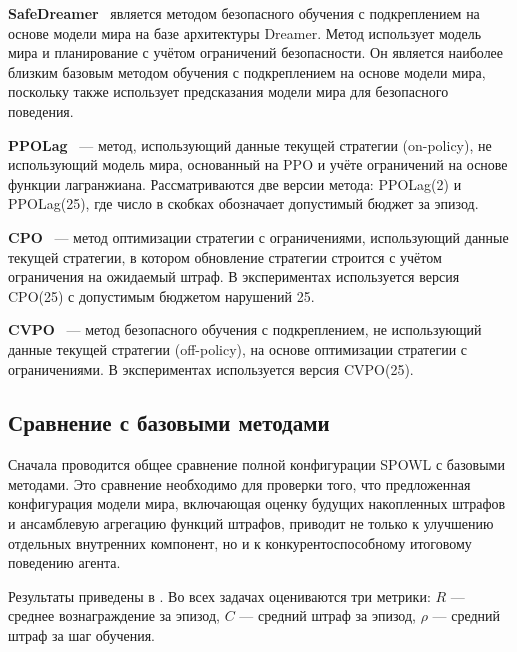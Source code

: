 \textbf{SafeDreamer}~\cite{safedreamer} является методом безопасного обучения с подкреплением на основе модели мира на базе архитектуры Dreamer. Метод использует модель мира и планирование с учётом ограничений безопасности. Он является наиболее близким базовым методом обучения с подкреплением на основе модели мира, поскольку также использует предсказания модели мира для безопасного поведения.

\textbf{PPOLag}~\cite{stooke2020pidlag} --- метод, использующий данные текущей стратегии (on-policy), не использующий модель мира, основанный на PPO и учёте ограничений на основе функции лагранжиана. Рассматриваются две версии метода: PPOLag(2) и PPOLag(25), где число в скобках обозначает допустимый бюджет за эпизод.

\textbf{CPO}~\cite{achiam2017cpo} --- метод оптимизации стратегии с ограничениями, использующий данные текущей стратегии, в котором обновление стратегии строится с учётом ограничения на ожидаемый штраф. В экспериментах используется версия CPO(25) с допустимым бюджетом нарушений 25.

\textbf{CVPO}~\cite{liu2022cvpo} --- метод безопасного обучения с подкреплением, не использующий данные текущей стратегии (off-policy), на основе оптимизации стратегии с ограничениями. В экспериментах используется версия CVPO(25).

\subsection{Сравнение с базовыми методами}
\label{subsec:spowl_baseline_comparison}

Сначала проводится общее сравнение полной конфигурации SPOWL с базовыми методами. Это сравнение необходимо для проверки того, что предложенная конфигурация модели мира, включающая оценку будущих накопленных штрафов и ансамблевую агрегацию функций штрафов, приводит не только к улучшению отдельных внутренних компонент, но и к конкурентоспособному итоговому поведению агента.

Результаты приведены в . Во всех задачах оцениваются три метрики: $R$ --- среднее вознаграждение за эпизод, $C$ --- средний штраф за эпизод, $\rho$ --- средний штраф за шаг обучения.

